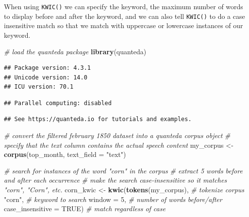 \documentclass[
]{article}
\newenvironment{Shaded}{\begin{snugshade}}{\end{snugshade}}
\newcommand{\AttributeTok}[1]{\textcolor[rgb]{0.13,0.29,0.53}{#1}}
\newcommand{\CommentTok}[1]{\textcolor[rgb]{0.56,0.35,0.01}{\textit{#1}}}
\newcommand{\ConstantTok}[1]{\textcolor[rgb]{0.56,0.35,0.01}{#1}}
\newcommand{\DecValTok}[1]{\textcolor[rgb]{0.00,0.00,0.81}{#1}}
\newcommand{\FunctionTok}[1]{\textcolor[rgb]{0.13,0.29,0.53}{\textbf{#1}}}
\newcommand{\NormalTok}[1]{#1}
\newcommand{\OtherTok}[1]{\textcolor[rgb]{0.56,0.35,0.01}{#1}}
\newcommand{\StringTok}[1]{\textcolor[rgb]{0.31,0.60,0.02}{#1}}
\begin{document}
When using \texttt{KWIC()} we can specify the keyword, the maximum
number of words to display before and after the keyword, and we can also
tell \texttt{KWIC()} to do a case insensitive match so that we match
with uppercase or lowercase instances of our keyword.

\begin{Shaded}
\begin{Highlighting}[]
\CommentTok{\# load the quanteda package}
\FunctionTok{library}\NormalTok{(quanteda)}
\end{Highlighting}
\end{Shaded}

\begin{verbatim}
## Package version: 4.3.1
## Unicode version: 14.0
## ICU version: 70.1
\end{verbatim}

\begin{verbatim}
## Parallel computing: disabled
\end{verbatim}

\begin{verbatim}
## See https://quanteda.io for tutorials and examples.
\end{verbatim}

\begin{Shaded}
\begin{Highlighting}[]
\CommentTok{\# convert the filtered february 1850 dataset into a quanteda corpus object}
\CommentTok{\# specify that the \textquotesingle{}text\textquotesingle{} column contains the actual speech content}
\NormalTok{my\_corpus }\OtherTok{\textless{}{-}} \FunctionTok{corpus}\NormalTok{(top\_month, }\AttributeTok{text\_field =} \StringTok{"text"}\NormalTok{) }

\CommentTok{\# search for instances of the word "corn" in the corpus}
\CommentTok{\# extract 5 words before and after each occurrence}
\CommentTok{\# make the search case{-}insensitive so it matches "corn", "Corn", etc.}
\NormalTok{corn\_kwic }\OtherTok{\textless{}{-}} \FunctionTok{kwic}\NormalTok{(}\FunctionTok{tokens}\NormalTok{(my\_corpus), }\CommentTok{\# tokenize corpus}
                  \StringTok{"corn"}\NormalTok{, }\CommentTok{\# keyword to search}
                  \AttributeTok{window =} \DecValTok{5}\NormalTok{, }\CommentTok{\# number of words before/after}
                  \AttributeTok{case\_insensitive =} \ConstantTok{TRUE}\NormalTok{) }\CommentTok{\# match regardless of case}
\end{Highlighting}
\end{Shaded}
\end{document}
